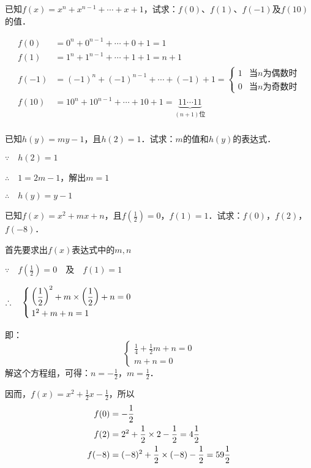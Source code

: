 \begin{example}
已知$f(x)=x^n+x^{n-1}+\cdots+x+1$，试求：$f(0)$、$f(1)$、$f(-1)$及$f(10)$的值．
\end{example}

\begin{solution}
\[\begin{split}
    f(0)&=0^n+0^{n-1}+\cdots +0+1=1\\
    f(1)&=1^n+1^{n-1}+\cdots +1+1=n+1\\
    f(-1)&=(-1)^n+(-1)^{n-1}+\cdots +(-1)+1=\begin{cases}
        1   & \text{当$n$为偶数时} \\
        0  &  \text{当$n$为奇数时}
    \end{cases}\\
    f(10)&=10^n+10^{n-1}+\cdots +10+1=\underbrace{11\cdots 11}_{(n+1)\text{位}} \\
\end{split}\]       
    
\end{solution}


\begin{example}
已知$h(y)=my-1$，且$h(2)=1$．试求：$m$的值和$h(y)$的表达式．
\end{example}

\begin{solution}
        $\because\quad h(2)=1$ 

$\therefore\quad 1=2m-1$，解出$m=1$

        $\therefore\quad h(y)=y-1$    
\end{solution}


\begin{example}
已知$f(x)=x^2+mx+n$，且$f\left(\frac{1}{2}\right)=0$，$f(1)=1$．试求：$f(0)$，$f(2)$，$f(-8)$．
\end{example}

\begin{solution}
   首先要求出$f(x)$表达式中的$m,n$
   
   $\because\quad f\left(\frac{1}{2}\right)=0\quad \text{及}\quad f(1)=1$

   $\therefore\quad \begin{cases}
    \left(\dfrac{1}{2}\right)^2+m\times \left(\dfrac{1}{2}\right)+n=0\\
    1^2+m+n=1
   \end{cases}$

即：    
\[\begin{cases}
    \frac{1}{4}+\frac{1}{2}m+n=0\\
    m+n=0
\end{cases} \]
解这个方程组，可得：$n=-\frac{1}{2}$，$m=\frac{1}{2}$．

因而，$f(x)=x^2+\frac{1}{2}x-\frac{1}{2}$，所以
\[\begin{split}
    f(0)&= -\dfrac{1}{2}\\
    f(2)&=2^2+\dfrac{1}{2}\times 2-\dfrac{1}{2}=4\dfrac{1}{2}\\
    f(-8)&=(-8)^2+\dfrac{1}{2}\times (-8)-\dfrac{1}{2}=59\dfrac{1}{2}
\end{split}\]
\end{solution}

